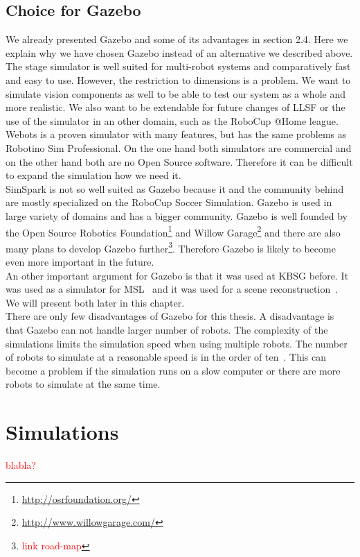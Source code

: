 \subsection{Choice for Gazebo}
We already presented Gazebo and some of its advantages in section 2.4. Here we explain why we have chosen Gazebo instead of an alternative we described above.\\
The stage simulator is well suited for multi-robot systems and comparatively fast and easy to use. However, the restriction to dimensions is a problem. We want to simulate vision components as well to be able to test our system as a whole and more realistic. We also want to be extendable for future changes of LLSF or the use of the simulator in an other domain, such as the RoboCup @Home league.\\
Webots is a proven simulator with many features, but has the same problems as Robotino Sim Professional. On the one hand both simulators are commercial and on the other hand both are no Open Source software. Therefore it can be difficult to expand the simulation how we need it.\\
SimSpark is not so well suited as Gazebo because it and the community behind are mostly specialized on the RoboCup Soccer Simulation. Gazebo is used in large variety of domains and has a bigger community. Gazebo is well founded by the Open Source Robotics Foundation\footnote{\url{http://osrfoundation.org/}} and Willow Garage\footnote{\url{http://www.willowgarage.com/}} and there are also many plans to develop Gazebo further\footnote{\textcolor{red}{link road-map}}. Therefore Gazebo is likely to become even more important in the future.\\
An other important argument for Gazebo is that it was used at KBSG before. It was used as a simulator for MSL~\cite{MultiLevelAbstraction} and it was used for a scene reconstruction~\cite{KlingenDA}. We will present both later in this chapter.\\
There are only few disadvantages of Gazebo for this thesis. A disadvantage is that Gazebo can not handle larger number of robots. The complexity of the simulations limits the simulation speed when using multiple robots. The number of robots to simulate at a reasonable speed is in the order of ten~\cite{GazeboDesign}. This can become a problem if the simulation runs on a slow computer or there are more robots to simulate at the same time.

\section{Simulations}
\textcolor{red}{blabla?}

